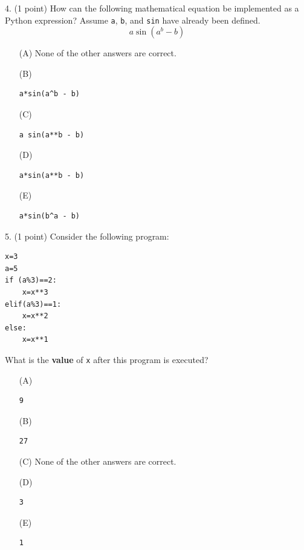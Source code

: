 \documentclass{article}
\begin{document}
\noindent
\begin{minipage}{\textwidth}
4. (1 point)
How can the following mathematical equation be implemented as a Python expression? Assume \verb|a|, \verb|b|, and \verb|sin| have already been defined.
$$a \sin(a^b - b)$$

\begin{enumerate}
\item[(A)]
None of the other answers are correct.

\item[(B)]
\begin{verbatim}a*sin(a^b - b)\end{verbatim}

\item[(C)]
\begin{verbatim}a sin(a**b - b)\end{verbatim}

\item[(D)]
\begin{verbatim}a*sin(a**b - b)\end{verbatim}

\item[(E)]
\begin{verbatim}a*sin(b^a - b)\end{verbatim}

\end{enumerate}
\end{minipage}
\vspace{2em}
\filbreak\vfil{}\vfilneg

\noindent
\begin{minipage}{\textwidth}
5. (1 point)
Consider the following program:
\begin{verbatim}
x=3
a=5
if (a%3)==2:
    x=x**3
elif(a%3)==1:
    x=x**2
else:
    x=x**1
\end{verbatim}
What is the \textbf{value} of \texttt{x} after this program is executed?

\begin{enumerate}
\item[(A)]
\begin{verbatim}9\end{verbatim}

\item[(B)]
\begin{verbatim}27\end{verbatim}

\item[(C)]
None of the other answers are correct.

\item[(D)]
\begin{verbatim}3\end{verbatim}

\item[(E)]
\begin{verbatim}1\end{verbatim}

\end{enumerate}
\end{minipage}
\vspace{2em}
\filbreak\vfil{}\vfilneg
\end{document}
